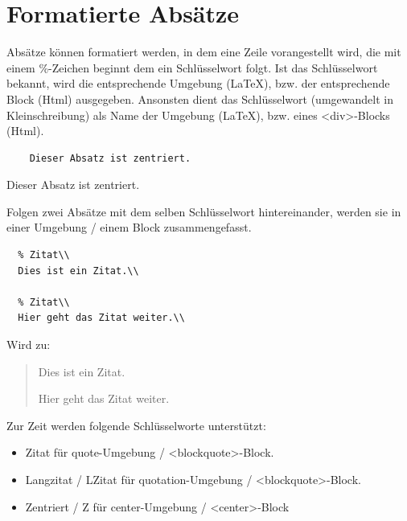 \documentclass{scrartcl}
\begin{document}
\section{Formatierte Absätze}

Absätze können formatiert werden, in dem eine Zeile
vorangestellt wird, die mit einem \%-Zeichen beginnt dem ein
Schlüsselwort folgt. Ist das Schlüsselwort bekannt, wird
die entsprechende Umgebung (LaTeX), bzw. der entsprechende
Block (Html) ausgegeben. Ansonsten dient das Schlüsselwort
(umgewandelt in Kleinschreibung) als Name der Umgebung
(LaTeX), bzw. eines <div>-Blocks (Html).

\begin{verbatim}
	Dieser Absatz ist zentriert.

\end{verbatim}

\begin{center}
Dieser Absatz ist zentriert.

\end{center}

Folgen zwei Absätze mit dem selben Schlüsselwort
hintereinander, werden sie in einer Umgebung / einem Block
zusammengefasst.

\begin{verbatim}
  % Zitat\\
  Dies ist ein Zitat.\\

  % Zitat\\
  Hier geht das Zitat weiter.\\

\end{verbatim}

Wird zu:

\begin{quote}
Dies ist ein Zitat.

Hier geht das Zitat weiter.

\end{quote}

Zur Zeit werden folgende Schlüsselworte unterstützt:

\begin{itemize}
\item Zitat für quote-Umgebung / <blockquote>-Block.
\item Langzitat / LZitat für quotation-Umgebung / <blockquote>-Block.
\item Zentriert / Z für center-Umgebung / <center>-Block

\end{itemize}
\end{document}
